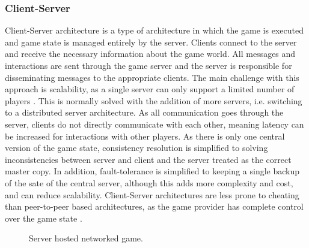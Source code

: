 \subsubsection{Client-Server}
Client-Server architecture is a type of architecture in which the game is executed and game state is managed entirely by the server. Clients connect to the server and receive the necessary information about the game world. All messages and interactions are sent through the game server and the server is responsible for disseminating messages to the appropriate clients. The main challenge with this approach is scalability, as a single server can only support a limited number of players \cite{Ferretti2018}. This is normally solved with the addition of more servers, i.e. switching to a distributed server architecture. As all communication goes through the server, clients do not directly communicate with each other, meaning latency can be increased for interactions with other players.
As there is only one central version of the game state, consistency resolution is simplified to solving inconsistencies between server and client and the server treated as the correct master copy. In addition, fault-tolerance is simplified to keeping a single backup of the sate of the central server, although this adds more complexity and cost, and can reduce scalability. Client-Server architectures are less prone to cheating than peer-to-peer based architectures, as the game provider has complete control over the game state \cite{P2PForMMOs}.

\begin{figure}
	\centering
	
	\caption{Server hosted networked game.}
\end{figure}

%
%	

